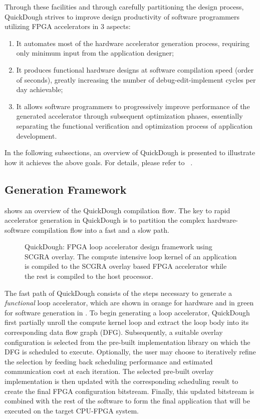 Through these facilities and through carefully partitioning the design process, QuickDough strives to improve design productivity of software programmers utilizing FPGA accelerators in 3 aspects:

\begin{enumerate}[nosep]
\item It automates most of the hardware accelerator generation process, requiring only minimum input from the application designer;
\item It produces functional hardware designs at software compilation speed (order of seconds), greatly increasing the number of debug-edit-implement cycles per day achievable;
\item It allows software programmers to progressively improve performance of the generated accelerator through subsequent optimization phases, essentially separating the functional verification and optimization process of application development.
\end{enumerate}

In the following subsections, an overview of QuickDough is presented to illustrate how it achieves the above goals.  For details, please refer to ~\cite{Lin:2012:EDC:2460216.2460227,Liu:2015:FSP}.

\subsection{Generation Framework}
 shows an overview of the QuickDough compilation flow.
The key to rapid accelerator generation in QuickDough is to partition the complex hardware-software compilation flow into a fast and a slow path. 

\begin{figure}
    \caption{QuickDough: FPGA loop accelerator design framework using 
        SCGRA overlay. The compute intensive loop kernel of an 
        application is compiled to the SCGRA overlay based FPGA
    accelerator while the rest is compiled to the host processor.}
    \label{fig:framework}
\end{figure}

The fast path of QuickDough consists of the steps necessary to generate a \emph{functional} loop accelerator, which are shown in orange for hardware and in green for software generation in .
To begin generating a loop accelerator, QuickDough first partially unroll the compute kernel loop and extract the loop body into its corresponding data flow graph (DFG).
Subsequently, a suitable overlay configuration is selected from the pre-built implementation library on which the DFG is scheduled to execute.
Optionally, the user may choose to iteratively refine the selection by feeding back scheduling performance and estimated communication cost at each iteration.
The selected pre-built overlay implementation is then updated with the corresponding scheduling result to create the final FPGA configuration bitstream.
Finally, this updated bitstream is combined with the rest of the software to form the final application that will be executed on the target CPU-FPGA system. 


